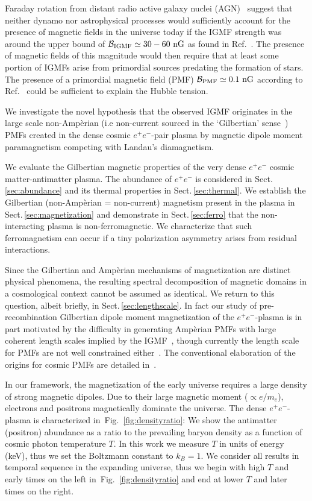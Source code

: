 \documentclass[aps,prd,floatfix,reprint]{revtex4-2}
\newcommand{\rf}[1]{Fig.~{\ref{#1}}}
\newcommand{\rsec}[1]{Sect.\,{\ref{#1}}}
\newcommand*{\xblue}{\color{black}}
\begin{document}
Faraday rotation from distant radio active galaxy nuclei (AGN)~\cite{Pomakov:2022cem} suggest that neither dynamo nor astrophysical processes would sufficiently account for the presence of magnetic fields in the universe today if the IGMF strength was around the upper bound of ${\cal B}_{\rm IGMF}\simeq30-60{\rm\ nG}$ as found in Ref.~\cite{Vernstrom:2021hru}. The presence of magnetic fields of this magnitude would then require that at least some portion of IGMFs arise from primordial sources predating the formation of stars. The presence of a primordial magnetic field (PMF) ${\cal B}_{\rm PMF}\simeq0.1{\rm\ nG}$ according to Ref.~\cite{Jedamzik:2020krr} could be sufficient to explain the Hubble tension.

We investigate the novel hypothesis that the observed IGMF originates in the large scale non-Amp{\`e}rian (i.e non-current sourced in the `Gilbertian' sense~\cite{Rafelski:2017hce}) PMFs created in the dense cosmic $e^{+}e^{-}$-pair plasma by magnetic dipole moment paramagnetism competing with Landau's diamagnetism.

{\xblue We evaluate the Gilbertian magnetic properties of the very dense $e^{+}e^{-}$ cosmic matter-antimatter plasma. The abundance of $e^{+}e^{-}$ is considered in \rsec{sec:abundance} and its thermal properties in \rsec{sec:thermal}. We establish the Gilbertian (non-Amp{\`e}rian = non-current) magnetism present in the plasma in \rsec{sec:magnetization} and demonstrate in \rsec{sec:ferro} that the non-interacting plasma is non-ferromagnetic. We characterize that such ferromagnetism can occur if a tiny polarization asymmetry arises from residual interactions.}

{\xblue Since the Gilbertian and Amp{\`e}rian mechanisms of magnetization are distinct physical phenomena, the resulting spectral decomposition of magnetic domains in a cosmological context cannot be assumed as identical. We return to this question, albeit briefly, in \rsec{sec:lengthscale}.} In fact our study of pre-recombination Gilbertian dipole moment magnetization of the $e^{+}e^{-}$-plasma is in part motivated by the difficulty in generating Amp{\`e}rian PMFs with large coherent length scales implied by the IGMF~\cite{Giovannini:2022rrl}, though currently the length scale for PMFs are not well constrained either~\cite{AlvesBatista:2021sln}. The conventional elaboration of the origins for cosmic PMFs are detailed in~\cite{Gaensler:2004gk,Durrer:2013pga,AlvesBatista:2021sln}.

In our framework, the magnetization of the early universe requires a large density of strong magnetic dipoles. Due to their large magnetic moment ($\propto e/m_e$), electrons and positrons magnetically dominate the universe. The dense $e^{+}e^{-}$-plasma is characterized in~\rf{fig:densityratio}: We show the antimatter (positron) abundance as a ratio to the prevailing baryon density as a function of cosmic photon temperature $T$. In this work we measure $T$ in units of energy (keV), thus we set the Boltzmann constant to $k_{B}=1$. We consider all results in temporal sequence in the expanding universe, thus we begin with high $T$ and early times on the left in~\rf{fig:densityratio} and end at lower $T$ and later times on the right.
\end{document}
